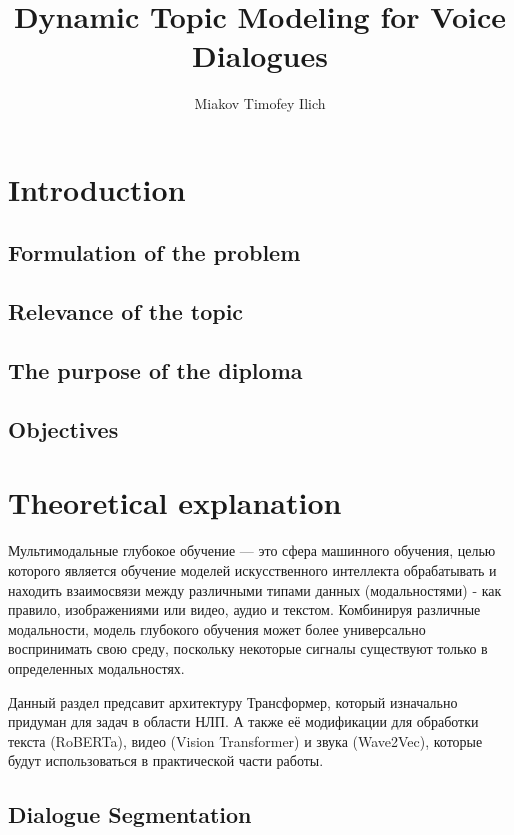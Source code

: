 \documentclass[PMI,VKR]{HSEUniversity}
\title{Dynamic Topic Modeling for Voice Dialogues}
\author{Miakov Timofey Ilich}
\begin{document}
\maketitle

\chapter{Introduction}

\section{Formulation of the problem}

\section{Relevance of the topic}

\section{The purpose of the diploma}

\section{Objectives}


\chapter{Theoretical explanation}

Мультимодальные глубокое обучение — это сфера машинного обучения, целью которого является обучение моделей искусственного интеллекта обрабатывать и находить взаимосвязи между различными типами данных (модальностями) - как правило, изображениями или видео, аудио и текстом. Комбинируя различные модальности, модель глубокого обучения может более универсально воспринимать свою среду, поскольку некоторые сигналы существуют только в определенных модальностях.

Данный раздел предсавит архитектуру Трансформер, который изначально придуман для задач в области НЛП. А также её модификации для обработки текста (RoBERTa), видео (Vision Transformer) и звука (Wave2Vec), которые будут использоваться в практической части работы. 


\section{Dialogue Segmentation}
\end{document}

